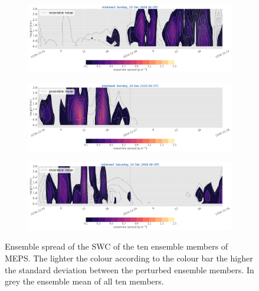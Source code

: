 \begin{figure}[t]\ContinuedFloat
	\centering
	\begin{subfigure}[t]{\textwidth}		\includegraphics[trim={0.cm 5.3cm 0cm 0cm},clip,width=\textwidth]{./fig_ensemble_spread/20161225}
		\caption{}\label{fig:ens_spread25}
	\end{subfigure}
	\begin{subfigure}[t]{\textwidth}		\includegraphics[trim={0.cm 5.3cm 0cm 0cm},clip,width=\textwidth]{./fig_ensemble_spread/20161226}
		\caption{}\label{fig:ens_spread26}
	\end{subfigure}
	\begin{subfigure}[t]{\textwidth}		\includegraphics[trim={15.cm 0cm 15cm 21cm},clip,width=\textwidth]{./fig_ensemble_spread/20161224}
	\end{subfigure}
	\caption{Ensemble spread of the SWC of the ten ensemble members of MEPS. The lighter the colour according to the colour bar the higher the standard deviation between the perturbed ensemble members. In grey the ensemble mean of all ten members.}\label{fig:ens_spread}
\end{figure}

